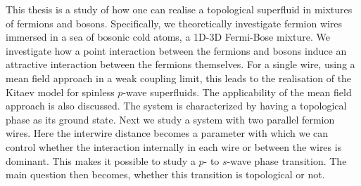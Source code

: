 \newpage
This thesis is a study of how one can realise a topological superfluid in mixtures of fermions and bosons. Specifically, we theoretically investigate fermion wires immersed in a sea of bosonic cold atoms, a 1D-3D Fermi-Bose mixture. We investigate how a point interaction between the fermions and bosons induce an attractive interaction between the fermions themselves. For a single wire, using a mean field approach in a weak coupling limit, this leads to the realisation of the Kitaev model for spinless $p$-wave superfluids. The applicability of the mean field approach is also discussed. The system is characterized by having a topological phase as its ground state. Next we study a system with two parallel fermion wires. Here the interwire distance becomes a parameter with which we can control whether the interaction internally in each wire or between the wires is dominant. This makes it possible to study a $p$- to $s$-wave phase transition. The main question then becomes, whether this transition is topological or not.  

